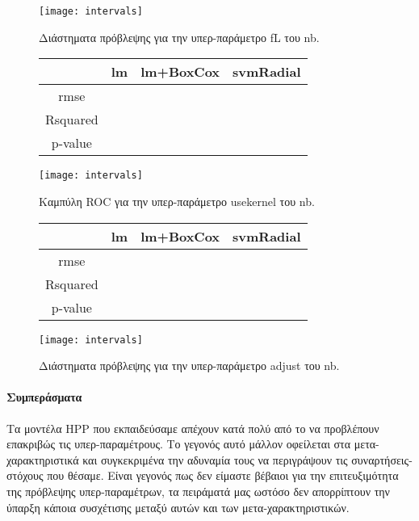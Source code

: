 \begin{figure}[H]
\begin{minipage}{0.48\textwidth}
	\centering
	\texttt{[image: intervals]}
	\caption{Διάστηματα πρόβλεψης για την υπερ-παράμετρο fL του nb.}	
\end{minipage}
\begin{minipage}{0.48\textwidth}
	\noindent
	\begin{center}
		\begin{tabular}{ |c|c|c|c| } 
			\hline
			& lm & lm+BoxCox & svmRadial\\
			\hline
			rmse & & &\\
			\hline
			Rsquared & & & \\
			\hline 
			p-value & & &\\				
			\hline
		\end{tabular}   
	\end{center}
\end{minipage} \qquad
\begin{minipage}{0.48\textwidth}
	\centering
	\texttt{[image: intervals]}
	\caption{Καμπύλη ROC  για την υπερ-παράμετρο usekernel του nb.}	
\end{minipage}
\begin{minipage}{0.48\textwidth}
	\noindent
	\begin{center}
		\begin{tabular}{ |c|c|c|c| } 
			\hline
			& lm & lm+BoxCox & svmRadial\\
			\hline
			rmse & & &\\
			\hline
			Rsquared & & & \\
			\hline 
			p-value & & &\\				
			\hline
		\end{tabular}   
	\end{center}
\end{minipage} \qquad
\begin{minipage}{0.48\textwidth}
	\centering
	\texttt{[image: intervals]}
	\caption{Διάστηματα πρόβλεψης για την υπερ-παράμετρο adjust του nb.}	
\end{minipage}
\end{figure}

\FloatBarrier

\paragraph{Συμπεράσματα}
Τα μοντέλα HPP που εκπαιδεύσαμε απέχουν κατά πολύ από το να προβλέπουν επακριβώς τις υπερ-παραμέτρους. Το γεγονός αυτό μάλλον οφείλεται στα μετα-χαρακτη\-ρι\-στικά και συγκεκριμένα την αδυναμία τους να περιγράψουν τις συναρτήσεις-στόχους που θέσαμε. Είναι γεγονός πως δεν είμαστε βέβαιοι για την επιτευξιμότητα της πρόβλεψης υπερ-παραμέτρων, τα πειράματά μας ωστόσο δεν απορρίπτουν την ύπαρξη κάποια συσχέτισης μεταξύ αυτών και των μετα-χαρακτηριστικών.

